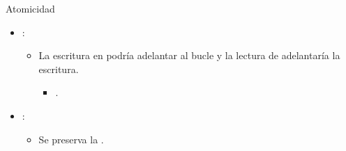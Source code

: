 \begin{frame}[t]{Atomicidad}
\makebox[\textwidth][c]{}
\begin{itemize}
  \item {}:
    \begin{itemize}
      \item La escritura en  podría adelantar al 
            bucle  y la lectura de  
            adelantaría la escritura.
        \begin{itemize}
          \item {}.
        \end{itemize}
    \end{itemize}
  \item {}:
    \begin{itemize}
      \item Se preserva la .
    \end{itemize}
\end{itemize}
\end{frame}

